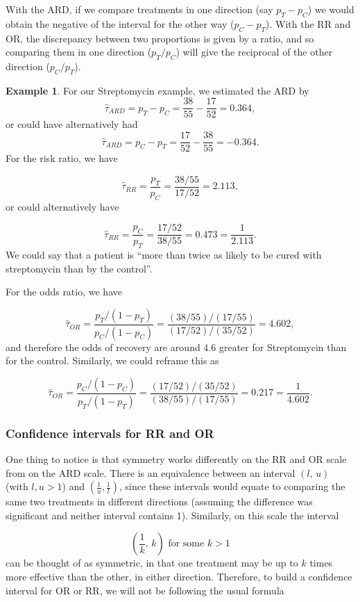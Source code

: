 \documentclass[
  openany]{book}
\theoremstyle{definition}
\theoremstyle{definition}
\newtheorem{example}{Example}[chapter]
\theoremstyle{definition}
\theoremstyle{definition}
\theoremstyle{remark}
\begin{document}
With the ARD, if we compare treatments in one direction (say \(p_T - p_C\)) we would obtain the negative of the interval for the other way (\(p_C - p_T\)). With the RR and OR, the discrepancy between two proportions is given by a ratio, and so comparing them in one direction (\(p_T / p_C\)) will give the reciprocal of the other direction (\(p_C / p_T\)).

\begin{example}
For our Streptomycin example, we estimated the ARD by
\[\hat\tau_{ARD}=p_T - p_C = \frac{38}{55} - \frac{17}{52} = 0.364,\]
or could have alternatively had
\[\hat\tau_{ARD}=p_C - p_T = \frac{17}{52} - \frac{38}{55} = - 0.364.\]
For the risk ratio, we have

\[\hat{\tau}_{RR} = \frac{p_T}{p_C} = \frac{38/55}{17/52} = 2.113,\]
or could alternatively have

\[\hat{\tau}_{RR} = \frac{p_C}{p_T} = \frac{17/52}{38/55} = 0.473 = \frac{1}{2.113}.\]
We could say that a patient is ``more than twice as likely to be cured with streptomycin than by the control''.

For the odds ratio, we have

\[\hat{\tau}_{OR} = \frac{p_T/\left(1-p_T\right)}{p_C/\left(1-p_C\right)} = \frac{(38/55)/(17/55)}{(17/52)/(35/52)} = 4.602, \]
and therefore the odds of recovery are around 4.6 greater for Streptomycin than for the control. Similarly, we could reframe this as

\[\hat{\tau}_{OR} = \frac{p_C/\left(1-p_C\right)}{p_T/\left(1-p_T\right)} = \frac{(17/52)/(35/52)}{(38/55)/(17/55)} = 0.217 = \frac{1}{4.602}.\]
\end{example}

\subsubsection{Confidence intervals for RR and OR}\label{ci-rr}

One thing to notice is that symmetry works differently on the RR and OR scale from on the ARD scale. There is an equivalence between an interval \(\left(l,\,u\right)\) (with \(l,u>1\)) and \(\left(\frac{1}{u},\frac{1}{l}\right)\), since these intervals would equate to comparing the same two treatments in different directions (assuming the difference was significant and neither interval contains 1). Similarly, on this scale the interval

\[\left(\frac{1}{k},\,k\right) \text{ for some }k>1 \]
can be thought of as symmetric, in that one treatment may be up to \(k\) times more effective than the other, in either direction. Therefore, to build a confidence interval for OR or RR, we will not be following the usual formula
\end{document}

